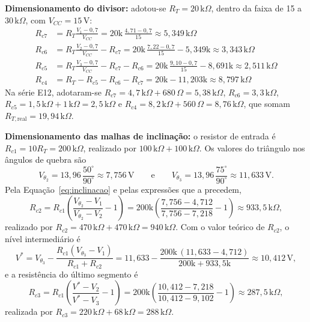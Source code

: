 \documentclass[11pt,a4paper]{article}
\begin{document}
\begin{itemize}
    \textbf{Dimensionamento do divisor:} adotou-se $R_T=20\,\text{k}\Omega$, dentro da faixa de 15 a $30\,\text{k}\Omega$, com $V_{CC}=15\,\text{V}$:
    \begin{align*}
        R_{c7}&=R_T\frac{V_1-0{,}7}{V_{CC}}=20\text{k}\,\frac{4{,}71-0{,}7}{15}\approx5{,}349\,\text{k}\Omega\\
        R_{c6}&=R_T\frac{V_2-0{,}7}{V_{CC}}-R_{c7}=20\text{k}\,\frac{7{,}22-0{,}7}{15}-5{,}349\text{k}\approx3{,}343\,\text{k}\Omega\\
        R_{c5}&=R_T\frac{V_3-0{,}7}{V_{CC}}-R_{c7}-R_{c6}=20\text{k}\,\frac{9{,}10-0{,}7}{15}-8{,}691\text{k}\approx2{,}511\,\text{k}\Omega\\
        R_{c4}&=R_T-R_{c5}-R_{c6}-R_{c7}=20\text{k}-11{,}203\text{k}\approx8{,}797\,\text{k}\Omega
    \end{align*}
    Na série E12, adotaram-se $R_{c7}=4{,}7\,\text{k}\Omega+680\,\Omega=5{,}38\,\text{k}\Omega$, $R_{c6}=3{,}3\,\text{k}\Omega$, $R_{c5}=1{,}5\,\text{k}\Omega+1\,\text{k}\Omega=2{,}5\,\text{k}\Omega$ e $R_{c4}=8{,}2\,\text{k}\Omega+560\,\Omega=8{,}76\,\text{k}\Omega$, que somam $R_{T,\text{real}}=19{,}94\,\text{k}\Omega$.

    \textbf{Dimensionamento das malhas de inclinação:} o resistor de entrada é $R_{c1}=10R_T=200\,\text{k}\Omega$, realizado por $100\,\text{k}\Omega+100\,\text{k}\Omega$. Os valores do triângulo nos ângulos de quebra são
    \[
    V_{\theta_2}=13{,}96\,\frac{50^\circ}{90^\circ}\approx7{,}756\,\text{V}
    \qquad\text{e}\qquad
    V_{\theta_3}=13{,}96\,\frac{75^\circ}{90^\circ}\approx11{,}633\,\text{V}.
    \]
    Pela Equação~\ref{eq:inclinacao} e pelas expressões que a precedem,
    \[
    R_{c2}=R_{c1}\left(\frac{V_{\theta_2}-V_1}{V_{\theta_2}-V_2}-1\right)
    =200\text{k}\left(\frac{7{,}756-4{,}712}{7{,}756-7{,}218}-1\right)\approx933{,}5\,\text{k}\Omega,
    \]
    realizado por $R_{c2}=470\,\text{k}\Omega+470\,\text{k}\Omega=940\,\text{k}\Omega$. Com o valor teórico de $R_{c2}$, o nível intermediário é
    \[
    V^*=V_{\theta_3}-\frac{R_{c1}(V_{\theta_3}-V_1)}{R_{c1}+R_{c2}}
    =11{,}633-\frac{200\text{k}\,(11{,}633-4{,}712)}{200\text{k}+933{,}5\text{k}}\approx10{,}412\,\text{V},
    \]
    e a resistência do último segmento é
    \[
    R_{c3}=R_{c1}\left(\frac{V^*-V_2}{V^*-V_3}-1\right)
    =200\text{k}\left(\frac{10{,}412-7{,}218}{10{,}412-9{,}102}-1\right)\approx287{,}5\,\text{k}\Omega,
    \]
    realizada por $R_{c3}=220\,\text{k}\Omega+68\,\text{k}\Omega=288\,\text{k}\Omega$.

\end{itemize}
\end{document}

